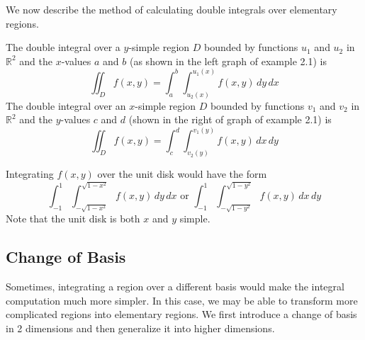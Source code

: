  We now describe the method of calculating double integrals over elementary regions. 
  \begin{theorem}
  The double integral over a $y$-simple region $D$ bounded by functions $u_1$ and $u_2$ in $\mathbb{R}^2$ and the $x$-values $a$ and $b$ (as shown in the left graph of example 2.1) is
  \[\iint_D f(x, y) = \int_a^b \int_{u_2 (x)}^{u_1 (x)} f(x, y) \, dy \, dx\]
  The double integral over an $x$-simple region $D$ bounded by functions $v_1$ and $v_2$ in $\mathbb{R}^2$ and the $y$-values $c$ and $d$ (shown in the right of graph of example 2.1) is 
  \[\iint_D f(x, y) = \int_c^d \int_{v_2 (y)}^{v_1 (y)} f(x, y) \, dx \, dy\]
  \end{theorem}

  \begin{example}
  Integrating $f(x, y)$ over the unit disk would have the form
  \[\int_{-1}^1 \int_{-\sqrt{1-x^2}}^{\sqrt{1-x^2}} f(x,y) \, dy\, dx \text{ or } \int_{-1}^1 \int_{-\sqrt{1-y^2}}^{\sqrt{1-y^2}} f(x,y) \, dx\, dy \]
  Note that the unit disk is both $x$ and $y$ simple. 
  \end{example}

\subsection{Change of Basis}

  Sometimes, integrating a region over a different basis would make the integral computation much more simpler. In this case, we may be able to transform more complicated regions into elementary regions. We first introduce a change of basis in 2 dimensions and then generalize it into higher dimensions. 
  
